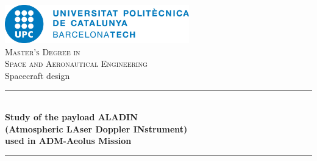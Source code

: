 
\begin{titlepage}

\newcommand{\HRule}{\rule{\linewidth}{0.5mm}} %

\center %

\includegraphics[width=0.6\textwidth]{img/UPC_logo.jpg}\\[0.4cm]

\textsc{\Large Master's Degree in\\ Space and Aeronautical Engineering}\\[1.8cm]

\Large Spacecraft design\\





\HRule \\[0.2cm]
{ \Large \bfseries
Study of the payload ALADIN\\ (Atmospheric LAser Doppler INstrument)\\
used in ADM-Aeolus Mission\\[0cm]
}
\HRule \\[3.5cm]



\end{titlepage}

